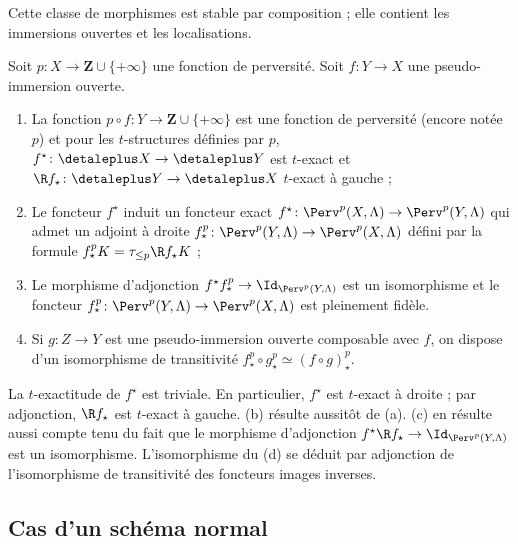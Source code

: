 \documentclass[10pt]{../fichiers-configuration-latex/smfart}
\begin{document}
Cette classe de morphismes est stable par composition ; elle contient les
immersions ouvertes et les localisations.

\begin{proposition2}\label{17-proposition-faisceaux-pervers-immersions-ouvertes}
Soit $p\colon X\to\mathbf{Z}\cup \{+\infty\}$ une fonction de perversité.
Soit $f\colon Y\to X$ une pseudo-immersion ouverte.
\begin{enumerate}
\item[(a)] La fonction $p\circ f\colon Y\to \mathbf{Z}\cup\{+\infty\}$
est une fonction de perversité (encore notée $p$)
et pour les $t$-structures définies par $p$, $f^\star\colon\detaleplus X\to
\detaleplus Y$ est $t$-exact et $\R f_\star\colon \detaleplus Y\to
\detaleplus X$
$t$-exact à gauche ;
\item[(b)] Le foncteur $f^\star$ induit un foncteur exact $f^\star\colon
\Perv^p(X,\Lambda)\to\Perv^p(Y,\Lambda)$ qui admet un adjoint à droite
$f^p_\star\colon \Perv^p(Y,\Lambda)\to \Perv^p(X,\Lambda)$ défini par la
formule $f_\star^p K=\tau_{\leq p}\R f_\star K$ ;
\item[(c)] Le morphisme d'adjonction $f^\star f^p_\star\to
\Id_{\Perv^p(Y,\Lambda)}$ est un
isomorphisme et le foncteur $f_\star^p\colon \Perv^p(Y,\Lambda)\to
\Perv^p(X,\Lambda)$ est pleinement fidèle.
\item[(d)] Si $g\colon Z\to Y$ est une pseudo-immersion ouverte composable
avec $f$, on dispose d'un isomorphisme de transitivité $f_\star^p\circ
g_\star^p\simeq (f\circ g)_\star^p$.
\end{enumerate}
\end{proposition2}

La $t$-exactitude de $f^\star$ est triviale. En particulier, $f^\star$ est
$t$-exact à droite ; par adjonction, $\R f_\star$ est $t$-exact à
gauche. (b) résulte aussitôt de (a). (c) en résulte aussi compte
tenu du fait que le morphisme d'adjonction $f^\star \R f_\star\to
\Id_{\Perv^p(Y,\Lambda)}$
est un isomorphisme. L'isomorphisme du (d) se déduit par adjonction de
l'isomorphisme de transitivité des foncteurs images inverses.

\subsection{Cas d'un schéma normal}%
\end{document}
